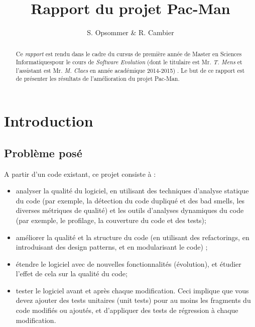 \documentclass[12pt,a4paper,final]{article}
\author{S. Opsommer \& R. Cambier}
\title{Rapport du projet Pac-Man}
\begin{document}
\umonsCoverPage
\pagebreak
\pagestyle{fancy}
\newpage
\thispagestyle{empty}
\begin{abstract}
Ce \emph{rapport} est rendu dans le cadre du cursus de première année de \og Master en Sciences Informatiques\fg  pour le cours de \emph{Software Evolution} (dont le titulaire est Mr. \emph{T. Mens} et l'assistant est Mr. \emph{M. Claes} en année académique 2014-2015) . Le but de ce rapport est de présenter les résultats de l'amélioration du projet Pac-Man.
\end{abstract}


\newpage
\thispagestyle{empty}
\tableofcontents
\newpage
\section{Introduction}\label{sec:intro}
\subsection{Problème posé}
A partir d'un code existant, ce projet consiste à : 
\begin{itemize}
\item analyser la qualité du logiciel, en utilisant des techniques d'analyse statique du code (par exemple, la détection du code dupliqué et des bad smells, les diverses métriques de qualité) et les outils d'analyses dynamiques du code (par exemple, le profilage, la couverture du code et des tests);
\item améliorer la qualité et la structure du code (en utilisant des refactorings, en introduisant des design patterns, et en modularisant le code) ;
\item étendre le logiciel avec de nouvelles fonctionnalités (évolution), et étudier l'effet de cela sur la qualité du code;
\item tester le logiciel avant et après chaque modification. Ceci implique que vous devez ajouter des tests unitaires (unit tests) pour au moins les fragments du code modifiés ou ajoutés, et d'appliquer des tests de régression à chaque modification.
\end{itemize}
\end{document}
